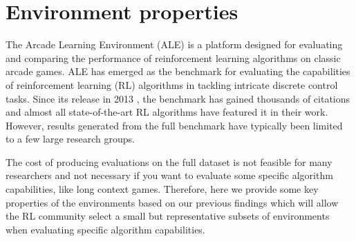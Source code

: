 \section{Environment properties}
\label{sec:environment_properties}

The Arcade Learning Environment (ALE) is a platform designed for evaluating and comparing the performance of reinforcement learning algorithms on classic arcade games. ALE has emerged as the benchmark for evaluating the capabilities of reinforcement learning (RL) algorithms in tackling intricate discrete control tasks. Since its release in 2013 \citep{bellemare2012ale}, the benchmark has gained thousands of citations and almost all state-of-the-art RL algorithms have featured it in their work. However, results generated from the full benchmark have typically been limited to a few large research groups.

The cost of producing evaluations on the full dataset is not feasible for many researchers and not necessary if you want to evaluate some specific algorithm capabilities, like long context games. Therefore, here we provide some key properties of the environments based on our previous findings which will allow the RL community select a small but representative subsets of environments when evaluating specific algorithm capabilities.